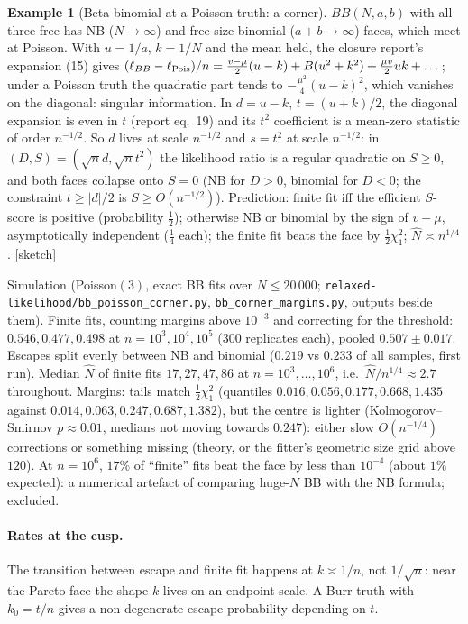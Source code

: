 \documentclass[11pt]{article}
\newcommand{\status}[1]{\textsf{[#1]}}
\theoremstyle{definition}
\newtheorem{example}[theorem]{Example}
\theoremstyle{remark}
\begin{document}
\begin{example}[Beta-binomial at a Poisson truth: a corner]\label{ex:bb-corner}
$BB(N,a,b)$ with all three free has NB ($N\to\infty$) and free-size binomial
($a+b\to\infty$) faces, which meet at Poisson. With $u=1/a$, $k=1/N$ and the
mean held, the closure report's expansion (15) gives
$(\ell_{BB}-\ell_{\rm Pois})/n=\frac{v-\mu}2(u-k)+B(u^2+k^2)+\frac{\mu v}2uk+\dots$;
under a Poisson truth the quadratic part tends to
$-\frac{\mu^2}4(u-k)^2$, which vanishes on the diagonal: singular
information. In $d=u-k$, $t=(u+k)/2$, the diagonal expansion is even in $t$
(report eq.~19) and its $t^2$ coefficient is a mean-zero statistic of order
$n^{-1/2}$. So $d$ lives at scale $n^{-1/2}$ and $s=t^2$ at scale
$n^{-1/2}$: in $(D,S)=(\sqrt n d,\sqrt n t^2)$ the likelihood ratio is a
regular quadratic on $S\ge0$, and both faces collapse onto $S=0$ (NB for
$D>0$, binomial for $D<0$; the constraint $t\ge|d|/2$ is $S\ge O(n^{-1/2})$).
Prediction: finite fit iff the efficient $S$-score is positive
(probability $\frac12$); otherwise NB or binomial by the sign of $v-\mu$,
asymptotically independent ($\frac14$ each); the finite fit beats the face
by $\frac12\chi^2_1$; $\hat N\asymp n^{1/4}$. \status{sketch}

Simulation (Poisson$(3)$, exact BB fits over $N\le20\,000$;
\texttt{relaxed-likelihood/bb\_poisson\_corner.py},
\texttt{bb\_corner\_margins.py}, outputs beside them). Finite fits, counting
margins above $10^{-3}$ and correcting for the threshold: $0.546, 0.477,
0.498$ at $n=10^3,10^4,10^5$ ($300$ replicates each), pooled $0.507\pm0.017$.
Escapes split evenly between NB and binomial ($0.219$ vs $0.233$ of all
samples, first run). Median $\hat N$ of finite fits $17,27,47,86$ at
$n=10^3,\dots,10^6$, i.e.\ $\hat N/n^{1/4}\approx2.7$ throughout. Margins:
tails match $\frac12\chi^2_1$ (quantiles $0.016, 0.056, 0.177, 0.668, 1.435$
against $0.014, 0.063, 0.247, 0.687, 1.382$), but the centre is lighter
(Kolmogorov--Smirnov $p\approx0.01$, medians not moving towards $0.247$):
either slow $O(n^{-1/4})$ corrections or something missing (theory, or
the fitter's geometric size grid above $120$). At $n=10^6$, $17\%$ of
``finite'' fits beat the face by less than $10^{-4}$ (about $1\%$ expected):
a numerical artefact of comparing huge-$N$ BB with the NB formula; excluded.
\end{example}

\paragraph{Rates at the cusp.} The transition between escape and finite
fit happens at $k\asymp1/n$, not $1/\sqrt n$: near the Pareto face the shape
$k$ lives on an endpoint scale. A Burr truth with $k_0=t/n$ gives a
non-degenerate escape probability depending on $t$.
\end{document}
